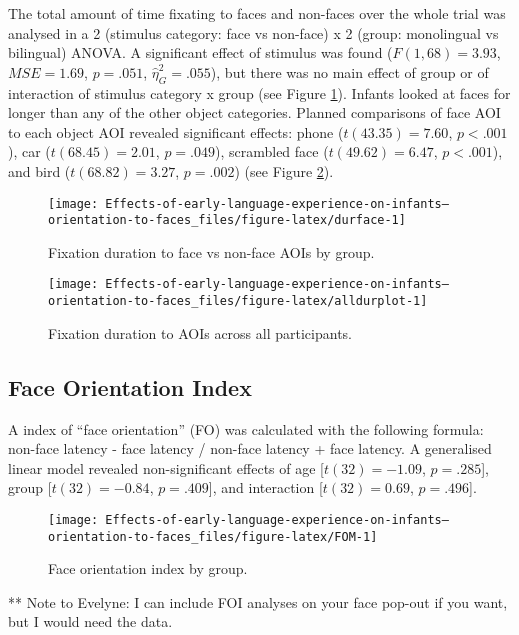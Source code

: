 \documentclass[english,man,floatsintext]{apa6}
\begin{document}
The total amount of time fixating to faces and non-faces over the whole trial was analysed in a 2 (stimulus category: face vs non-face) x 2 (group: monolingual vs bilingual) ANOVA. A significant effect of stimulus was found (\(F(1, 68) = 3.93\), \(\mathit{MSE} = 1.69\), \(p = .051\), \(\hat{\eta}^2_G = .055\)), but there was no main effect of group or of interaction of stimulus category x group (see Figure \ref{fig:durface}). Infants looked at faces for longer than any of the other object categories. Planned comparisons of face AOI to each object AOI revealed significant effects: phone (\(t(43.35) = 7.60\), \(p < .001\)), car (\(t(68.45) = 2.01\), \(p = .049\)), scrambled face (\(t(49.62) = 6.47\), \(p < .001\)), and bird (\(t(68.82) = 3.27\), \(p = .002\)) (see Figure \ref{fig:alldurplot}).

\begin{figure}
\texttt{[image: Effects-of-early-language-experience-on-infants--orientation-to-faces\_files/figure-latex/durface-1]} \caption{Fixation duration to face vs non-face AOIs by group.}\label{fig:durface}
\end{figure}
\begin{figure}
\texttt{[image: Effects-of-early-language-experience-on-infants--orientation-to-faces\_files/figure-latex/alldurplot-1]} \caption{Fixation duration to AOIs across all participants.}\label{fig:alldurplot}
\end{figure}

\hypertarget{face-orientation-index}{%
\subsection{Face Orientation Index}\label{face-orientation-index}}

A index of \enquote{face orientation} (FO) was calculated with the following formula: non-face latency - face latency / non-face latency + face latency. A generalised linear model revealed non-significant effects of age {[}\(t(32) = -1.09\), \(p = .285\){]}, group {[}\(t(32) = -0.84\), \(p = .409\){]}, and interaction {[}\(t(32) = 0.69\), \(p = .496\){]}.

\begin{figure}
\texttt{[image: Effects-of-early-language-experience-on-infants--orientation-to-faces\_files/figure-latex/FOM-1]} \caption{Face orientation index by group.}\label{fig:FOM}
\end{figure}

** Note to Evelyne: I can include FOI analyses on your face pop-out if you want, but I would need the data.
\end{document}
